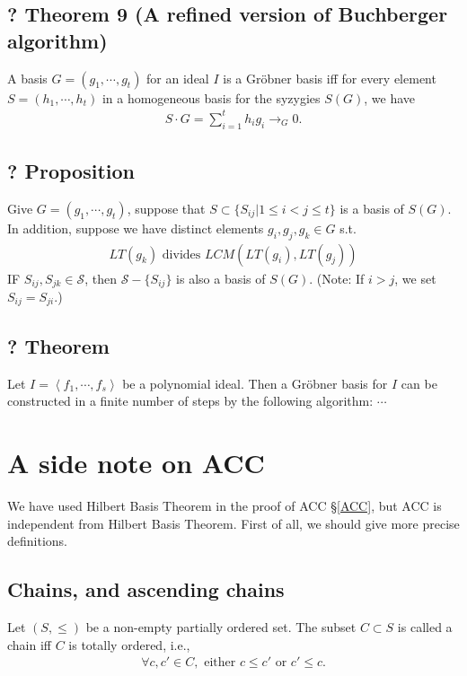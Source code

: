 \documentclass[11pt]{book}
\begin{document}
\subsection{? Theorem 9 (A refined version of Buchberger algorithm)}
A basis $G = (g_1, \cdots, g_t)$ for an ideal $I$ is a Gr\"obner basis iff for every element $S = (h_1, \cdots, h_t)$ in a homogeneous basis for the syzygies $S(G)$, we have
\begin{eqnarray}
S \cdot G = \sum_{i = 1}^t h_i g_i \to_G 0.
\end{eqnarray}

\subsection{? Proposition} 
Give $G = (g_1, \cdots, g_t)$, suppose that $S \subset \{S_{ij} | 1 \leq i < j \leq t\}$ is a basis of $S(G)$.
In addition, suppose we have distinct elements $g_i, g_j, g_k \in G$ s.t.
\begin{eqnarray}
LT(g_k) \text{ divides } LCM( LT(g_i), LT(g_j))
\end{eqnarray}
IF $S_{ij}, S_{jk} \in \mathcal{S}$, then $\mathcal{S} -\{ S_{ij} \}$ is also a basis of $S(G)$.
(Note: If $i > j$, we set $S_{ij} = S_{ji}$.)

\subsection{? Theorem}
Let $I = \left< f_1, \cdots, f_s \right>$ be a polynomial ideal.
Then a Gr\"obner basis for $I$ can be constructed in a finite number of steps by the following algorithm: $\cdots$


\section{A side note on ACC}
We have used Hilbert Basis Theorem in the proof of ACC \S\ref{ACC}, but ACC is independent from Hilbert Basis Theorem.
First of all, we should give more precise definitions.

\subsection{Chains, and ascending chains}
Let $(S, \leq)$ be a non-empty partially ordered set.
The subset $C \subset S$ is called a chain iff $C$ is totally ordered, i.e.,
\begin{eqnarray}
\forall c,c' \in C, \text{ either } c \leq c' \text{ or } c' \leq c.
\end{eqnarray}
\end{document}
